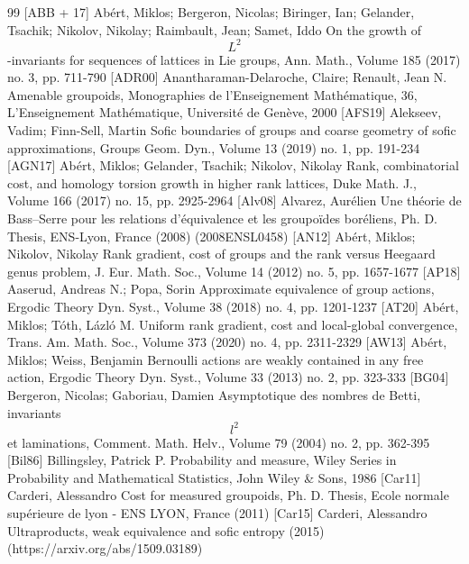 \begin{thebibliography}{99}
 [ABB + 17] Abért, Miklos; Bergeron, Nicolas; Biringer, Ian; Gelander, Tsachik; Nikolov, Nikolay; Raimbault, Jean; Samet, Iddo On the growth of $${L}^2$$-invariants for sequences of lattices in Lie groups, Ann. Math., Volume 185 (2017) no. 3, pp. 711-790
 [ADR00] Anantharaman-Delaroche, Claire; Renault, Jean N. Amenable groupoids, Monographies de l’Enseignement Mathématique, 36, L’Enseignement Mathématique, Université de Genève, 2000
 [AFS19] Alekseev, Vadim; Finn-Sell, Martin Sofic boundaries of groups and coarse geometry of sofic approximations, Groups Geom. Dyn., Volume 13 (2019) no. 1, pp. 191-234
 [AGN17] Abért, Miklos; Gelander, Tsachik; Nikolov, Nikolay Rank, combinatorial cost, and homology torsion growth in higher rank lattices, Duke Math. J., Volume 166 (2017) no. 15, pp. 2925-2964
 [Alv08] Alvarez, Aurélien Une théorie de Bass–Serre pour les relations d’équivalence et les groupoïdes boréliens, Ph. D. Thesis, ENS-Lyon, France (2008) (2008ENSL0458)
 [AN12] Abért, Miklos; Nikolov, Nikolay Rank gradient, cost of groups and the rank versus Heegaard genus problem, J. Eur. Math. Soc., Volume 14 (2012) no. 5, pp. 1657-1677
 [AP18] Aaserud, Andreas N.; Popa, Sorin Approximate equivalence of group actions, Ergodic Theory Dyn. Syst., Volume 38 (2018) no. 4, pp. 1201-1237
 [AT20] Abért, Miklos; Tóth, Lázló M. Uniform rank gradient, cost and local-global convergence, Trans. Am. Math. Soc., Volume 373 (2020) no. 4, pp. 2311-2329
 [AW13] Abért, Miklos; Weiss, Benjamin Bernoulli actions are weakly contained in any free action, Ergodic Theory Dyn. Syst., Volume 33 (2013) no. 2, pp. 323-333
 [BG04] Bergeron, Nicolas; Gaboriau, Damien Asymptotique des nombres de Betti, invariants $$l^2$$ et laminations, Comment. Math. Helv., Volume 79 (2004) no. 2, pp. 362-395
 [Bil86] Billingsley, Patrick P. Probability and measure, Wiley Series in Probability and Mathematical Statistics, John Wiley \& Sons, 1986
 [Car11] Carderi, Alessandro Cost for measured groupoids, Ph. D. Thesis, Ecole normale supérieure de lyon - ENS LYON, France (2011)
 [Car15] Carderi, Alessandro Ultraproducts, weak equivalence and sofic entropy (2015) (https://arxiv.org/abs/1509.03189)

\end{thebibliography}
